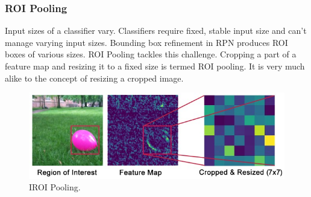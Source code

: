 \subsubsection{ROI Pooling}
Input sizes of a classifier vary. Classifiers require fixed, stable input size and can’t manage varying input sizes. Bounding box refinement in RPN produces ROI boxes of various sizes. ROI Pooling tackles this challenge. Cropping a part of a feature map and resizing it to a fixed size is termed ROI pooling. It is very much alike to the concept of resizing a cropped image.
\begin{figure} 
\centering
  \includegraphics[width=0.5\linewidth]{images/roi.jpg}
   \caption{IROI Pooling.}
\end{figure}